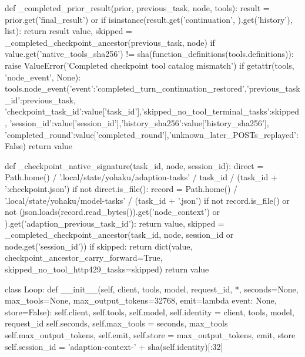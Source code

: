 {def _completed_prior_result(prior, previous_task, node, tools):
    result = prior.get('final_result') or {}
    if isinstance(result.get('continuation', {}).get('history'), list):
        return result
    value, skipped = _completed_checkpoint_ancestor(previous_task, node)
    if value.get('native_tools_sha256') != sha(function_definitions(tools.definitions)):
        raise ValueError('Completed checkpoint tool catalog mismatch')
    if getattr(tools, 'node_event', None):
        tools.node_event({'event':'completed_turn_continuation_restored','previous_task_id':previous_task,
            'checkpoint_task_id':value['task_id'],'skipped_no_tool_terminal_tasks':skipped,
            'session_id':value['session_id'],'history_sha256':value['history_sha256'],
            'completed_round':value['completed_round'],'unknown_later_POSTs_replayed':False})
    return value

def _checkpoint_native_signature(task_id, node, session_id):
    direct = Path.home() / '.local/state/yohaku/adaption-tasks' / task_id / (task_id + ':checkpoint.json')
    if not direct.is_file():
        record = Path.home() / '.local/state/yohaku/model-tasks' / (task_id + '.json')
        if not record.is_file() or not (json.loads(record.read_bytes()).get('node_context') or {}).get('adaption_previous_task_id'):
            return {}
    value, skipped = _completed_checkpoint_ancestor(task_id, node, session_id or node.get('session_id'))
    if skipped:
        return dict(value, checkpoint_ancestor_carry_forward=True, skipped_no_tool_http429_tasks=skipped)
    return value


class Loop:
    def __init__(self, client, tools, model, request_id, *, seconds=None, max_tools=None,
                 max_output_tokens=32768, emit=lambda event: None, store=False):
        self.client, self.tools, self.model, self.identity = client, tools, model, request_id
        self.seconds, self.max_tools = seconds, max_tools
        self.max_output_tokens, self.emit, self.store = max_output_tokens, emit, store
        self.session_id = 'adaption-context-' + sha(self.identity)[:32]

}
